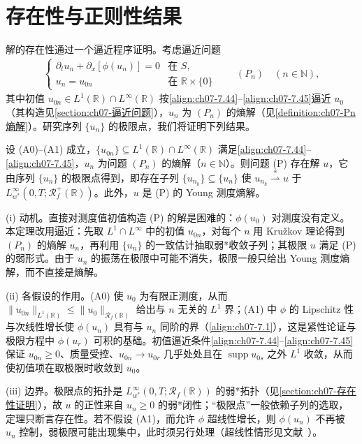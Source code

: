 \documentclass[../../main.tex]{subfiles}%
\begin{document}
\section{存在性与正则性结果}\label{section:ch07-存在性}

解的存在性通过一个逼近程序证明。考虑逼近问题
\begin{align*}
\begin{cases}
\partial_t u_n+\partial_x[\phi(u_n)]=0 & \text{在 }S,\\
u_n=u_{0n} & \text{在 }\mathbb{R}\times\{0\}
\end{cases}
\qquad(P_n)\quad(n\in\mathbb{N}),
\end{align*}
其中初值 $u_{0n}\in L^1(\mathbb{R})\cap L^\infty(\mathbb{R})$ 按\eqref{align:ch07-7.44}--\eqref{align:ch07-7.45}逼近 $u_0$（其构造见\cref{section:ch07-逼近问题}），$u_n$ 为 $(P_n)$ 的熵解（见\cref{definition:ch07-Pn熵解}）。研究序列 $\{u_n\}$ 的极限点，我们将证明下列结果。

\begin{theorem}\label{theorem:ch07-7.3.1}
设 (A0)--(A1) 成立，$\{u_{0n}\}\subseteq L^1(\mathbb{R})\cap L^\infty(\mathbb{R})$ 满足\eqref{align:ch07-7.44}--\eqref{align:ch07-7.45}，$u_n$ 为问题 $(P_n)$ 的熵解（$n\in\mathbb{N}$）。则问题 (P) 存在解 $u$，它由序列 $\{u_n\}$ 的极限点得到，即存在子列 $\{u_{n_k}\}\subseteq\{u_n\}$ 使 $u_{n_k}\stackrel{*}{\rightharpoonup}u$ 于 $L^\infty_{w^*}(0,T;\mathscr{R}_f^+(\mathbb{R}))$。此外，$u$ 是 (P) 的 Young 测度熵解。
\end{theorem}

\begin{remark}\label{remark:ch07-7.3.1动机}
(i) 动机。直接对测度值初值构造 (P) 的解是困难的：$\phi(u_0)$ 对测度没有定义。本定理改用逼近：先取 $L^1\cap L^\infty$ 中的初值 $u_{0n}$，对每个 $n$ 用 Kružkov 理论得到 $(P_n)$ 的熵解 $u_n$，再利用 $\{u_n\}$ 的一致估计抽取弱*收敛子列；其极限 $u$ 满足 (P) 的弱形式。由于 $u_n$ 的振荡在极限中可能不消失，极限一般只给出 Young 测度熵解，而不直接是熵解。

(ii) 各假设的作用。(A0) 使 $u_0$ 为有限正测度，从而 $\|u_{0n}\|_{L^1(\mathbb{R})}\leqslant\|u_0\|_{\mathscr{R}_f(\mathbb{R})}$ 给出与 $n$ 无关的 $L^1$ 界；(A1) 中 $\phi$ 的 Lipschitz 性与次线性增长使 $\phi(u_n)$ 具有与 $u_n$ 同阶的界（\eqref{align:ch07-7.1}），这是紧性论证与极限方程中 $\phi(u_r)$ 可积的基础。初值逼近条件\eqref{align:ch07-7.44}--\eqref{align:ch07-7.45}保证 $u_{0n}\geqslant0$、质量受控、$u_{0n}\to u_{0r}$ 几乎处处且在 $\operatorname{supp}u_{0s}$ 之外 $L^1$ 收敛，从而使初值项在取极限时收敛到 $u_0$。

(iii) 边界。极限点的拓扑是 $L^\infty_{w^*}(0,T;\mathscr{R}_f(\mathbb{R}))$ 的弱*拓扑（见\cref{section:ch07-存在性证明}），故 $u$ 的正性来自 $u_n\geqslant0$ 的弱*闭性；“极限点”一般依赖子列的选取，定理只断言存在性。若不假设 (A1)，而允许 $\phi$ 超线性增长，则 $\phi(u_n)$ 不再被 $u_n$ 控制，弱极限可能出现集中，此时须另行处理（超线性情形见文献~\cite{ref67}）。
\end{remark}
\end{document}
